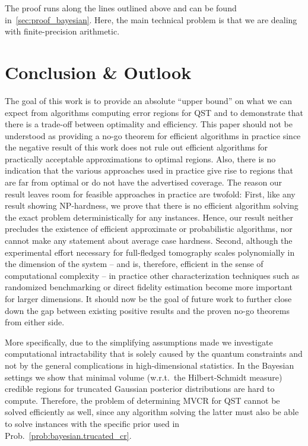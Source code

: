 The proof runs along the lines outlined above and can be found in~\ref{sec:proof_bayesian}.
Here, the main technical problem is that we are dealing with finite-precision arithmetic.

\section{Conclusion \& Outlook}
\label{sec:outlook}

The goal of this work is to provide an absolute ``upper bound'' on what we can expect from algorithms computing error regions for QST and to demonstrate that there is a trade-off between optimality and efficiency.
This paper should not be understood as providing a no-go theorem for efficient algorithms in practice since the negative result of this work does not rule out efficient algorithms for practically acceptable approximations to optimal regions.
Also, there is no indication that the various approaches used in practice give rise to regions that are far from optimal or do not have the advertised coverage.
The reason our result leaves room for feasible approaches in practice are twofold:
First, like any result showing NP-hardness, we prove that there is no efficient algorithm solving the exact problem deterministically for any instances.
Hence, our result neither precludes the existence of efficient approximate or probabilistic algorithms, nor cannot make any statement about average case hardness.
Second, although the experimental effort necessary for full-fledged tomography scales polynomially in the dimension of the system -- and is, therefore, efficient in the sense of computational complexity -- in practice other characterization techniques such as randomized benchmarking or direct fidelity estimation become more important for larger dimensions.
It should now be the goal of future work to further close down the gap between existing positive results and the proven no-go theorems from either side.


More specifically, due to the simplifying assumptions made we investigate computational intractability that is solely caused by the quantum constraints and not by the general complications in high-dimensional statistics.
In the Bayesian settings we show that minimal volume (w.r.t.\ the Hilbert-Schmidt measure) credible regions for truncated Gaussian posterior distributions are hard to compute.
Therefore, the problem of determining MVCR for QST cannot be solved efficiently as well, since any algorithm solving the latter must also be able to solve instances with the specific prior used in Prob.~\ref{prob:bayesian.trucated_cr}.


